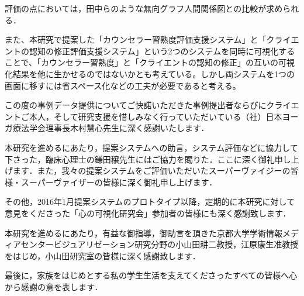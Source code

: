 \documentclass[shuuron]{kuee}
\begin{document}
評価の点においては，田中ら\cite{tanaka}のような無向グラフ人間関係図との比較が求められる．

また、本研究で提案した「カウンセラー習熟度評価支援システム」と「クライエントの認知の修正評価支援システム」という2つのシステムを同時に可視化することで、「カウンセラー習熟度」と「クライエントの認知の修正」の互いの可視化結果を他に生かせるのではないかとも考えている。しかし両システムを1つの画面に移すには省スペース化などの工夫が必要であると考える。




\begin{acknowledgements}
  この度の事例データ提供についてご快諾いただきた事例提出者ならびにクライエントご本人，そして研究支援を惜しみなく行っていただいている（社）日本ヨーガ療法学会理事長木村慧心先生に深く感謝いたします．

  本研究を進めるにあたり，提案システムへの助言，システム評価などに協力して下さった，臨床心理士の鎌田穣先生にはご協力を賜りた．ここに深く御礼申し上げます．また，我々の提案システムをご評価いただいたスーパーヴァイジーの皆様・スーパーヴァイザーの皆様に深く御礼申し上げます．

  その他，2016年1月提案システムのプロトタイプ以降，定期的に本研究に対して意見をくださった「心の可視化研究会」参加者の皆様にも深く感謝致します．

  本研究を進めるにあたり，有益な御指導，御助言を頂きた京都大学学術情報メディアセンタービジュアリゼーション研究分野の小山田耕二教授，江原康生准教授をはじめ，小山田研究室の皆様に深く感謝致します．




  最後に，家族をはじめとする私の学生生活を支えてくださったすべての皆様へ心から感謝の意を表します．
\end{acknowledgements}





\end{document}
